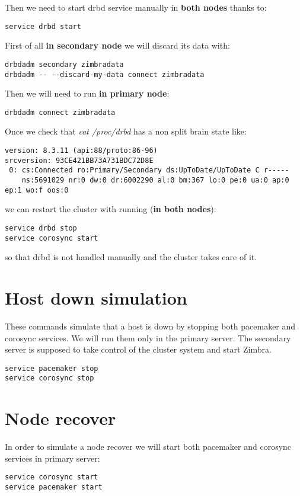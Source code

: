 Then we need to start drbd service manually in \textbf{both nodes} thanks to:
\begin{verbatim}
service drbd start
\end{verbatim}

First of all \textbf{in secondary node} we will discard its data with:
\begin{verbatim}
drbdadm secondary zimbradata
drbdadm -- --discard-my-data connect zimbradata
\end{verbatim}
Then we will need to run \textbf{in primary node}:
\begin{verbatim}
drbdadm connect zimbradata
\end{verbatim}

Once we check that \textit{cat /proc/drbd} has a non split brain state like:
\begin{verbatim}
version: 8.3.11 (api:88/proto:86-96)
srcversion: 93CE421BB73A731BDC72D8E 
 0: cs:Connected ro:Primary/Secondary ds:UpToDate/UpToDate C r-----
    ns:5691029 nr:0 dw:0 dr:6002290 al:0 bm:367 lo:0 pe:0 ua:0 ap:0 ep:1 wo:f oos:0
\end{verbatim}
we can restart the cluster with running (\textbf{in both nodes}):
\begin{verbatim}
service drbd stop
service corosync start
\end{verbatim}
so that drbd is not handled manually and the cluster takes care of it.

\section {Host down simulation}
These commands simulate that a host is down by stopping both pacemaker and corosync services. We will run them only in the primary server. The secondary server is supposed to take control of the cluster system and start Zimbra.

\begin{verbatim}
service pacemaker stop
service corosync stop
\end{verbatim}

\section {Node recover}
In order to simulate a node recover we will start both pacemaker and corosync services in primary server:
\begin{verbatim}
service corosync start
service pacemaker start
\end{verbatim}

